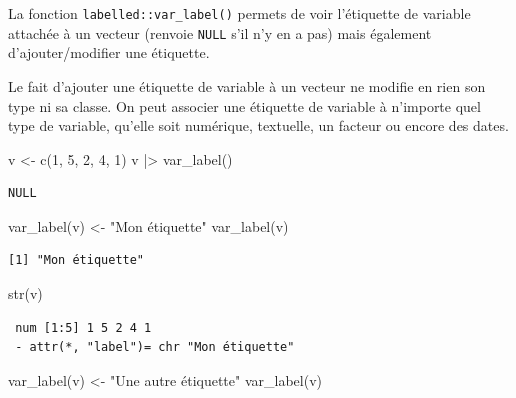 \documentclass[
  letterpaper,
  DIV=11,
  numbers=noendperiod,
  oneside]{scrreprt}
\newenvironment{Shaded}{\begin{snugshade}}{\end{snugshade}}
\newcommand{\DecValTok}[1]{\textcolor[rgb]{0.68,0.00,0.00}{#1}}
\newcommand{\FunctionTok}[1]{\textcolor[rgb]{0.28,0.35,0.67}{#1}}
\newcommand{\NormalTok}[1]{\textcolor[rgb]{0.00,0.23,0.31}{#1}}
\newcommand{\OtherTok}[1]{\textcolor[rgb]{0.00,0.23,0.31}{#1}}
\newcommand{\SpecialCharTok}[1]{\textcolor[rgb]{0.37,0.37,0.37}{#1}}
\newcommand{\StringTok}[1]{\textcolor[rgb]{0.13,0.47,0.30}{#1}}
\begin{document}
La fonction \texttt{labelled::var\_label()} permets de voir l'étiquette
de variable attachée à un vecteur (renvoie \texttt{NULL} s'il n'y en a
pas) mais également d'ajouter/modifier une étiquette.

Le fait d'ajouter une étiquette de variable à un vecteur ne modifie en
rien son type ni sa classe. On peut associer une étiquette de variable à
n'importe quel type de variable, qu'elle soit numérique, textuelle, un
facteur ou encore des dates.

\begin{Shaded}
\begin{Highlighting}[]
\NormalTok{v }\OtherTok{\textless{}{-}} \FunctionTok{c}\NormalTok{(}\DecValTok{1}\NormalTok{, }\DecValTok{5}\NormalTok{, }\DecValTok{2}\NormalTok{, }\DecValTok{4}\NormalTok{, }\DecValTok{1}\NormalTok{)}
\NormalTok{v }\SpecialCharTok{|\textgreater{}} \FunctionTok{var\_label}\NormalTok{()}
\end{Highlighting}
\end{Shaded}

\begin{verbatim}
NULL
\end{verbatim}

\begin{Shaded}
\begin{Highlighting}[]
\FunctionTok{var\_label}\NormalTok{(v) }\OtherTok{\textless{}{-}} \StringTok{"Mon étiquette"}
\FunctionTok{var\_label}\NormalTok{(v)}
\end{Highlighting}
\end{Shaded}

\begin{verbatim}
[1] "Mon étiquette"
\end{verbatim}

\begin{Shaded}
\begin{Highlighting}[]
\FunctionTok{str}\NormalTok{(v)}
\end{Highlighting}
\end{Shaded}

\begin{verbatim}
 num [1:5] 1 5 2 4 1
 - attr(*, "label")= chr "Mon étiquette"
\end{verbatim}

\begin{Shaded}
\begin{Highlighting}[]
\FunctionTok{var\_label}\NormalTok{(v) }\OtherTok{\textless{}{-}} \StringTok{"Une autre étiquette"}
\FunctionTok{var\_label}\NormalTok{(v)}
\end{Highlighting}
\end{Shaded}
\end{document}
